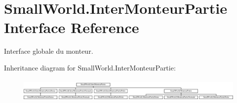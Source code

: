 \hypertarget{interface_small_world_1_1_inter_monteur_partie}{\section{Small\-World.\-Inter\-Monteur\-Partie Interface Reference}
\label{interface_small_world_1_1_inter_monteur_partie}
}


Interface globale du monteur.  


Inheritance diagram for Small\-World.\-Inter\-Monteur\-Partie\-:\begin{figure}[H]
\begin{center}
\leavevmode
\includegraphics[height=1.171548cm]{interface_small_world_1_1_inter_monteur_partie}
\end{center}
\end{figure}
